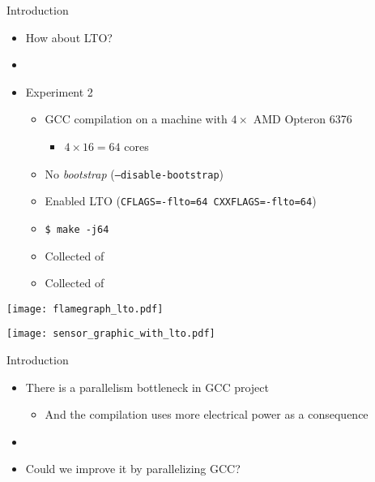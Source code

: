 \begin{frame}{Introduction}
    \begin{itemize}
        \item How about LTO?
        \item[]
        \item Experiment 2
        \begin{itemize}
            \item GCC compilation on a machine with $4\times$ AMD Opteron 6376
                \begin{itemize}
                    \item $4 \times 16 = 64$ cores
                \end{itemize}
            \item No \textit{bootstrap} (\texttt{--disable-bootstrap})
            \item Enabled LTO (\texttt{CFLAGS=-flto=64 CXXFLAGS=-flto=64})
            \item \texttt{\$ make -j64}
            \item Collected {\color{blue}{Compilation Time}} of {\color{red}{each file}}
            \item Collected {\color{blue}{Consumed Energy}} of {\color{red}{all CPUs}}
        \end{itemize}
    \end{itemize}
\end{frame}

\begin{frame}
    \texttt{[image: flamegraph\_lto.pdf]}
    \label{fig:analysis_lto}
\end{frame}

\begin{frame}
    \centering
    \texttt{[image: sensor\_graphic\_with\_lto.pdf]}
    \label{fig:sensor_graphic_lto}
\end{frame}


\begin{frame}{Introduction}
    \begin{itemize}
        \item There is a parallelism bottleneck in GCC project
            \begin{itemize}
                \item And the compilation uses more electrical power as a consequence
            \end{itemize}
        \item[]
        \item Could we improve it by parallelizing GCC?
    \end{itemize}
\end{frame}

